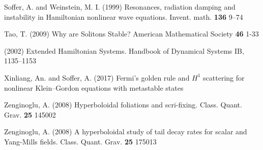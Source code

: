 \begin{thebibliography}{}
 Soffer, A. and Weinstein, M. I. (1999)
Resonances, radiation damping and instability in Hamiltonian nonlinear wave equations. Invent. math. {\bf 136} 9--74

 Tao, T. (2009)
Why are Solitons Stable? American Mathematical Society {\bf 46} 1-33

 (2002)
Extended Hamiltonian Systems. Handbook of Dynamical Systems IB, 1135--1153

 Xinliang, An. and Soffer, A. (2017)
Fermi's golden rule and $H^1$ scattering for nonlinear Klein--Gordon equations with metastable states

 Zenginoglu, A. (2008)
Hyperboloidal foliations and scri-fixing. Class. Quant. Grav. {\bf 25} 145002

 Zenginoglu, A. (2008)
A hyperboloidal study of tail decay rates for scalar and Yang-Mills fields. Class. Quant. Grav. {\bf 25} 175013





\end{thebibliography}